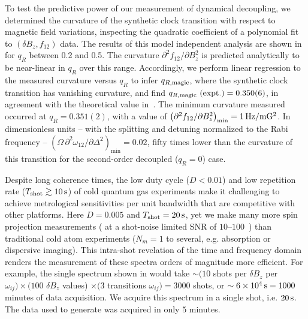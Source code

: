 \documentclass[aps,prl,reprint,superscriptaddress,floatfix]{revtex4-1}
\begin{document}
To test the predictive power of our measurement of dynamical decoupling, we determined the curvature of the synthetic clock transition with respect to magnetic field variations, inspecting the quadratic coefficient of a polynomial fit to $(\delta B_z, f_{12})$ data.
The results of this model independent analysis are shown in~ for $q_R$ between 0.2 and 0.5.
The curvature $\partial^2 f_{12}/\partial B_z^2$ is predicted analytically to be near-linear in $q_R$ over this range.
Accordingly, we perform linear regression to the measured curvature versus $q_R$ to infer $q_{R,\text{magic}}$, where the synthetic clock transition has vanishing curvature, and find $q_{R,\text{magic}}\text{ (expt.)} = 0.350(6)$, in agreement with the theoretical value in~.
The minimum curvature measured occurred at $q_R = 0.351(2)$, with a value of $\left(\partial^2 f_{12}/\partial B_z^2\right)_{\text{min}} = \unit[1]{Hz/mG^2}$.
In dimensionless units -- with the splitting and detuning normalized to the Rabi frequency -- $\left(\Omega\, \partial^2\omega_{12}/\partial \Delta^2\right)_{\text{min}} = 0.02$, fifty times lower than the curvature of this transition for the second-order decoupled ($q_R = 0$) case.

Despite long coherence times, the low duty cycle ($D < 0.01$) and low repetition rate ($T_\text{shot} \gtrsim \unit[10]{s}$) of cold quantum gas experiments make it challenging to achieve metrological sensitivities per unit bandwidth that are competitive with other platforms.
Here $D=0.005$ and $T_\text{shot} = \unit[20]{s}$, yet we make many more spin projection measurements ( at a shot-noise limited SNR of $10$--$100$~\cite{jasperse_magic-wavelength_2017}) than traditional cold atom experiments ($N_m = 1$ to several, e.g. absorption or dispersive imaging).
This intra-shot revelation of the time and frequency domain renders the measurement of these spectra orders of magnitude more efficient.
For example, the single spectrum shown in  would take $\sim (10$ shots per $\delta B_z$ per $\omega_{ij} ) \times (100$ $\delta B_z$ values) $\times (3 $ transitions $\omega_{ij}) = 3000$ shots, or $\sim \unit[6\times10^4]{s} = 1000$ minutes of data acquisition.
We acquire this spectrum in a single shot, i.e. $\unit[20]{s}$.
The data used to generate  was acquired in only $5$ minutes.
\end{document}
